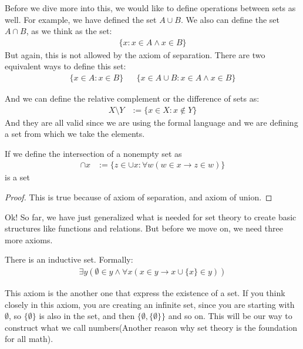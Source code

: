 \documentclass{tufte-handout}
\begin{document}
Before we dive more into this, we would like to define operations between sets as well. For example, we have defined the set $A \cup B$. We also can define the set $A \cap B$, as we think as the set:
\begin{align*}
	\{x: x \in A \wedge x \in B\}
\end{align*}
But again, this is not allowed by the axiom of separation. There are two equivalent ways to define this set:
\begin{align*}
	\{x \in A: x \in B\} && \{x \in A \cup B: x \in A \wedge x \in B\}
\end{align*}

And we can define the relative complement or the difference of sets as:
\begin{align*}
	X \setminus Y &:= \{x \in X: x \not\in Y\}
\end{align*}
And they are all valid since we are using the formal language and we are defining a set from which we take the elements. 

\begin{theorem}
	If we define the intersection of a nonempty set as
	\begin{align*}
		\cap x &:= \{z \in \cup x: \forall w(w \in x \rightarrow z \in w)\}
	\end{align*}
	is a set
\end{theorem}
\begin{proof}
	This is true because of axiom of separation, and axiom of union.
\end{proof}


Ok! So far, we have just generalized what is needed for set theory to create basic structures like functions and relations. But before we move on, we need three more axioms.

\begin{axiom}
	There is an inductive set. Formally:
	\begin{align*}
		\exists y(\emptyset \in y \wedge \forall x(x \in y \rightarrow x \cup \{x\} \in y))
	\end{align*}
\end{axiom}

This axiom is the another one that express the existence of a set. If you think closely in this axiom, you are creating an infinite set, since you are starting with $\emptyset$, so $\{\emptyset\}$ is also in the set, and then $\{\emptyset, \{\emptyset\}\}$ and so on. This will be our way to construct what we call numbers(Another reason why set theory is the foundation for all math).
\end{document}
